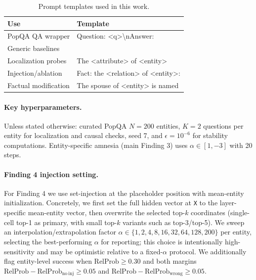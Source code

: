 \documentclass[10pt,twocolumn]{article}
\begin{document}
\begin{table}[!h]
\centering
\scriptsize
\begingroup
\setlength{\tabcolsep}{2pt}
\renewcommand{\arraystretch}{1.08}
\begin{tabular}{@{}
  >{\raggedright\arraybackslash}p{}
  >{\raggedright\arraybackslash}p{}
@{}}
\toprule
\textbf{Use} & \textbf{Template} \\
\midrule
PopQA QA wrapper & {\ttfamily Question: <q>\allowbreak\textbackslash{}nAnswer:} \\
Generic baselines & {} \\
Localization probes & {\ttfamily The <attribute> of <entity>} \\
Injection/ablation & {\ttfamily Fact: the <relation> of <entity>:} \\
Factual modification & {\ttfamily The spouse of <entity> is named} \\
\bottomrule
\end{tabular}
\endgroup
\caption{Prompt templates used in this work.}
\label{tab:prompts}
\end{table}

\paragraph{Key hyperparameters.} Unless stated otherwise: curated PopQA $N=200$ entities, $K=2$ questions per entity for localization and causal checks, seed 7, and $\epsilon=10^{-6}$ for stability computations. Entity-specific amnesia (main Finding 3) uses $\alpha \in [1, -3]$ with 20 steps.
\paragraph{Finding 4 injection setting.} For Finding 4 we use set-injection at the placeholder position with mean-entity initialization. Concretely, we first set the full hidden vector at \texttt{X} to the layer-specific mean-entity vector, then overwrite the selected top-$k$ coordinates (single-cell top-1 as primary, with small top-$k$ variants such as top-3/top-5). We sweep an interpolation/extrapolation factor $\alpha \in \{1,2,4,8,16,32,64,128,200\}$ per entity, selecting the best-performing $\alpha$ for reporting; this choice is intentionally high-sensitivity and may be optimistic relative to a fixed-$\alpha$ protocol. We additionally flag entity-level success when $\mathrm{RelProb}\ge 0.30$ and both margins $\mathrm{RelProb}-\mathrm{RelProb}_{\mathrm{no\ inj}}\ge 0.05$ and $\mathrm{RelProb}-\mathrm{RelProb}_{\mathrm{wrong}}\ge 0.05$.
\end{document}
